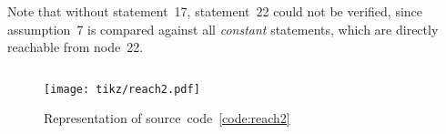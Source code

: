 \documentclass[british]{article}
\newenvironment{code}{\captionsetup{type=listing}}{}
\newcommand\prv{bc}
\begin{document}
Note that without statement~17, statement~22 could not be verified, since
assumption~7 is compared against all \emph{constant} statements, which are
directly reachable from node~22.
\pagebreak{}

\begin{code}
\label{code:reach2}
\inputminted[linenos]{\prv}{examples/reach2.prove}
\end{code}

\begin{figure}[!h]
\caption{Representation of source~code~\ref{code:reach2}}\label{fig:reach2}
\centering
\texttt{[image: tikz/reach2.pdf]}
\end{figure}

\pagebreak{}

\begingroup
{}
\setlength\bibitemsep{10pt}
\printbibliography\
\endgroup
\end{document}
